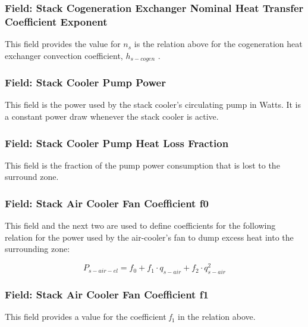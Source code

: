 \subsubsection{Field: Stack Cogeneration Exchanger Nominal Heat Transfer Coefficient Exponent}\label{field-stack-cogeneration-exchanger-nominal-heat-transfer-coefficient-exponent}

This field provides the value for \({n_s}\) is the relation above for the cogeneration heat exchanger convection coefficient, \({h_{s - cogen}}\) .

\subsubsection{Field: Stack Cooler Pump Power}\label{field-stack-cooler-pump-power}

This field is the power used by the stack cooler's circulating pump in Watts. It is a constant power draw whenever the stack cooler is active.

\subsubsection{Field: Stack Cooler Pump Heat Loss Fraction}\label{field-stack-cooler-pump-heat-loss}

This field is the fraction of the pump power consumption that is lost to the surround zone.

\subsubsection{Field: Stack Air Cooler Fan Coefficient f0}\label{field-stack-air-cooler-fan-coefficient-f0}

This field and the next two are used to define coefficients for the following relation for the power used by the air-cooler's fan to dump excess heat into the surrounding zone:

\begin{equation}
{P_{s - air - el}} = {f_0} + {f_1} \cdot {q_{s - air}} + {f_2} \cdot q_{s - air}^2
\end{equation}

\subsubsection{Field: Stack Air Cooler Fan Coefficient f1}\label{field-stack-air-cooler-fan-coefficient-f1}

This field provides a value for the coefficient \emph{f\(_{1}\)} in the relation above.

